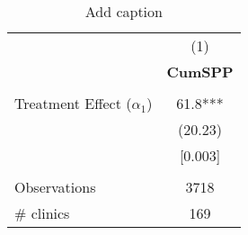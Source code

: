 \begin{table}[htbp]
  \centering
  \caption{Add caption}
    \begin{tabular}{lc}
          & (1) \\
          & \textbf{CumSPP} \\
          &  \\
    Treatment Effect ($\alpha_1$) & 61.8*** \\
          & (20.23) \\
          & [0.003] \\
          &  \\
    Observations & 3718 \\
    \# clinics & 169 \\
    \end{tabular}%
  \label{tab:addlabel}%
\end{table}%
